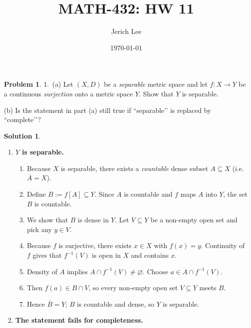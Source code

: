 \documentclass[12pt]{article}
\title{MATH-432: HW 11}
\author{Jerich Lee}
\date{\today}
\theoremstyle{definition} %
\newtheorem{solution}{Solution}
\newtheorem{problem}{Problem}
\theoremstyle{plain} %
\begin{document}
\maketitle
\begin{problem}
  1.\ (a) Let $(X,D)$ be a \emph{separable} metric space and let  
  \(f:X\to Y\) be a continuous \emph{surjection} onto a metric space \(Y\).  
  Show that \(Y\) is separable.  
  
  \noindent(b) Is the statement in part (a) still true if “separable’’ is replaced by “complete’’?
  \end{problem}
  
  \begin{solution}
  \begin{enumerate}[]
  \item \textbf{\(Y\) is separable.}
  
  \begin{enumerate}[]
  \item Because \(X\) is separable, there exists a \emph{countable} dense subset  
        \(A\subseteq X\) (i.e.\ \(\overline{A}=X\)).
  
  \item Define \(B:=f[A]\subseteq Y\).  
        Since \(A\) is countable and \(f\) maps \(A\) into \(Y\), the set \(B\) is countable.
  
  \item We show that \(B\) is dense in \(Y\).  
        Let \(V\subseteq Y\) be a non-empty open set and pick any \(y\in V\).
  
  \item Because \(f\) is surjective, there exists \(x\in X\) with \(f(x)=y\).  
        Continuity of \(f\) gives that \(f^{-1}(V)\) is open in \(X\) and contains \(x\).
  
  \item Density of \(A\) implies \(A\cap f^{-1}(V)\neq\varnothing\).  
        Choose \(a\in A\cap f^{-1}(V)\).
  
  \item Then \(f(a)\in B\cap V\), so every non-empty open set \(V\subseteq Y\) meets \(B\).
  
  \item Hence \(\overline{B}=Y\); \(B\) is countable and dense, so \(Y\) is separable.
  \end{enumerate}
  
  \item \textbf{The statement fails for completeness.}
  

\end{enumerate}
\end{solution}
\end{document}
